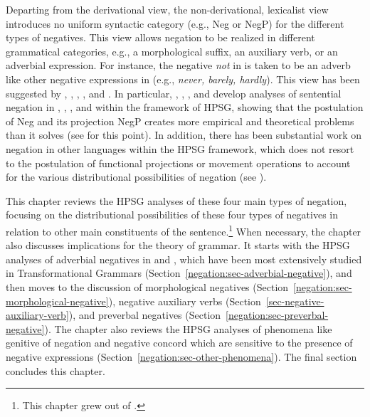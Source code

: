 \documentclass[output=paper,biblatex,babelshorthands,newtxmath,draftmode,colorlinks,citecolor=brown]{langscibook}
\begin{document}
\largerpage[.8]
Departing from the derivational view, the non-derivational, lexicalist view
introduces no uniform syntactic category (e.g., Neg or NegP) for the different types of
negatives. This view allows negation to be realized in different grammatical categories, e.g., a
morphological suffix, an auxiliary verb, or an adverbial expression. For instance, the negative
\emph{not} in  is taken to be an adverb like other negative expressions in
 (e.g., \textit{never, barely, hardly}). This view has been suggested by
\citet[343--347]{Jackendoff:72}, \citet[]{Baker:91}, \citet{Ernst:92}, \citet[]{Kim:00},
and \citet[]{Warner2000a-u}. 
In particular, \citet{KS:96}, \citet{AG:97}, \citet{Kim:00}, and \citet{KS:02} develop analyses of sentential negation in , , , and  within the framework of HPSG, showing that the postulation of Neg and its projection NegP creates more empirical and theoretical problems than it solves (see \citealt{Newmeyer:2006} for this point).
In addition, there has been substantial work on negation in other languages within the HPSG framework, which
does not resort to the postulation of functional projections or movement operations to account for the various distributional possibilities
of negation (see \citealt{PK:99, BJ:00, Prz:00, Kupsc:02, Swart:02, Borsley:05, Crysmann:10, Bender:13}).

This chapter reviews the HPSG analyses of these four main types of negation,
focusing on the distributional possibilities of these four types of negatives in
relation to other main constituents of the sentence.\footnote{This chapter grew out of \citet{Kim:00,kim:18}.} When
necessary, the chapter also discusses implications for
the theory of grammar.
It starts with the HPSG analyses of adverbial negatives in  and , which
have been most extensively studied in Transformational Grammars (Section~\ref{negation:sec-adverbial-negative}),
and then moves to the discussion of morphological
negatives (Section~\ref{negation:sec-morphological-negative}), negative auxiliary verbs
(Section~\ref{sec-negative-auxiliary-verb}), and preverbal negatives (Section~\ref{negation:sec-preverbal-negative}). The chapter
also reviews the HPSG analyses of phenomena like genitive of negation and
negative concord which are sensitive to the presence of negative expressions (Section~\ref{negation:sec-other-phenomena}). The
final section concludes this chapter.
\end{document}
